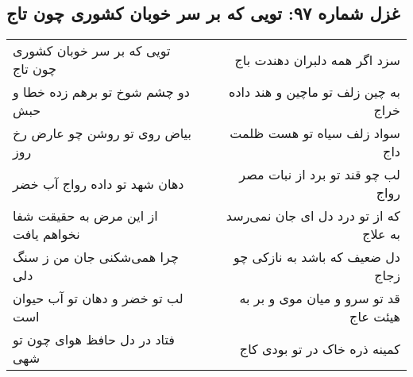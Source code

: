 \begin{center}
\section*{غزل شماره ۹۷: تویی که بر سر خوبان کشوری چون تاج}
\label{sec:sh097}
\begin{longtable}{l p{0.5cm} r}
تویی که بر سر خوبان کشوری چون تاج
&&
سزد اگر همه دلبران دهندت باج
\\
دو چشم شوخ تو برهم زده خطا و حبش
&&
به چین زلف تو ماچین و هند داده خراج
\\
بیاض روی تو روشن چو عارض رخ روز
&&
سواد زلف سیاه تو هست ظلمت داج
\\
دهان شهد تو داده رواج آب خضر
&&
لب چو قند تو برد از نبات مصر رواج
\\
از این مرض به حقیقت شفا نخواهم یافت
&&
که از تو درد دل ای جان نمی‌رسد به علاج
\\
چرا همی‌شکنی جان من ز سنگ دلی
&&
دل ضعیف که باشد به نازکی چو زجاج
\\
لب تو خضر و دهان تو آب حیوان است
&&
قد تو سرو و میان موی و بر به هیئت عاج
\\
فتاد در دل حافظ هوای چون تو شهی
&&
کمینه ذره خاک در تو بودی کاج
\\
\end{longtable}
\end{center}

